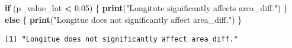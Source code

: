 \documentclass[
  11pt,
]{article}
\newenvironment{Shaded}{\begin{snugshade}}{\end{snugshade}}
\newcommand{\ControlFlowTok}[1]{\textcolor[rgb]{0.13,0.29,0.53}{\textbf{#1}}}
\newcommand{\FloatTok}[1]{\textcolor[rgb]{0.00,0.00,0.81}{#1}}
\newcommand{\FunctionTok}[1]{\textcolor[rgb]{0.13,0.29,0.53}{\textbf{#1}}}
\newcommand{\NormalTok}[1]{#1}
\newcommand{\SpecialCharTok}[1]{\textcolor[rgb]{0.81,0.36,0.00}{\textbf{#1}}}
\newcommand{\StringTok}[1]{\textcolor[rgb]{0.31,0.60,0.02}{#1}}
\begin{document}
\begin{Shaded}
\begin{Highlighting}[]
\ControlFlowTok{if}\NormalTok{ (p\_value\_lat }\SpecialCharTok{\textless{}} \FloatTok{0.05}\NormalTok{) \{}
    \FunctionTok{print}\NormalTok{(}\StringTok{"Longitute significantly affects area\_diff."}\NormalTok{)}
\NormalTok{\} }\ControlFlowTok{else}\NormalTok{ \{}
    \FunctionTok{print}\NormalTok{(}\StringTok{"Longitue does not significantly affect area\_diff."}\NormalTok{)}
\NormalTok{\}}
\end{Highlighting}
\end{Shaded}

\begin{verbatim}
[1] "Longitue does not significantly affect area_diff."
\end{verbatim}
\end{document}
